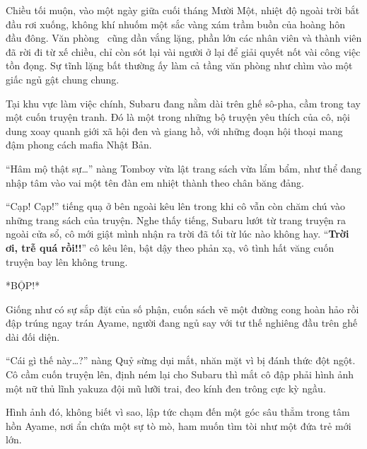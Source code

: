 \documentclass[../main.tex]{subfiles}
\begin{document}

Chiều tối muộn, vào một ngày giữa cuối tháng Mười Một, nhiệt độ ngoài trời bắt đầu rơi xuống, không khí nhuốm một sắc vàng xám trầm buồn của hoàng hôn đầu đông. Văn phòng \hll\ cũng dần vắng lặng, phần lớn các nhân viên và thành viên đã rời đi từ xế chiều, chỉ còn sót lại vài người ở lại để giải quyết nốt vài công việc tồn đọng. Sự tĩnh lặng bất thường ấy làm cả tầng văn phòng như chìm vào một giấc ngủ gật chung chung.

Tại khu vực làm việc chính, Subaru đang nằm dài trên ghế sô-pha, cầm trong tay một cuốn truyện tranh. Đó là một trong những bộ truyện yêu thích của cô, nội dung xoay quanh giới xã hội đen và giang hồ, với những đoạn hội thoại mang đậm phong cách mafia Nhật Bản.

``Hâm mộ thật sự\dots'' nàng Tomboy vừa lật trang sách vừa lẩm bẩm, như thể đang nhập tâm vào vai một tên đàn em nhiệt thành theo chân băng đảng.

``Cạp! Cạp!'' tiếng quạ ở bên ngoài kêu lên trong khi cô vẫn còn chăm chú vào những trang sách của truyện. Nghe thấy tiếng, Subaru lướt từ trang truyện ra ngoài cửa sổ, cô mới giật mình nhận ra trời đã tối từ lúc nào không hay. ``\textbf{Trời ơi, trễ quá rồi!!}'' cô kêu lên, bật dậy theo phản xạ, vô tình hất văng cuốn truyện bay lên không trung.

*BỘP!*

Giống như có sự sắp đặt của số phận, cuốn sách vẽ một đường cong hoàn hảo rồi đập trúng ngay trán Ayame, người đang ngủ say với tư thế nghiêng đầu trên ghế dài đối diện.


``Cái gì thế này\dots?'' nàng Quỷ sừng dụi mắt, nhăn mặt vì bị đánh thức đột ngột. Cô cầm cuốn truyện lên, định ném lại cho Subaru thì mắt cô đập phải hình ảnh một nữ thủ lĩnh yakuza đội mũ lưỡi trai, đeo kính đen trông cực kỳ ngầu.

Hình ảnh đó, không biết vì sao, lập tức chạm đến một góc sâu thẳm trong tâm hồn Ayame, nơi ẩn chứa một sự tò mò, ham muốn tìm tòi như một đứa trẻ mới lớn.
\end{document}
